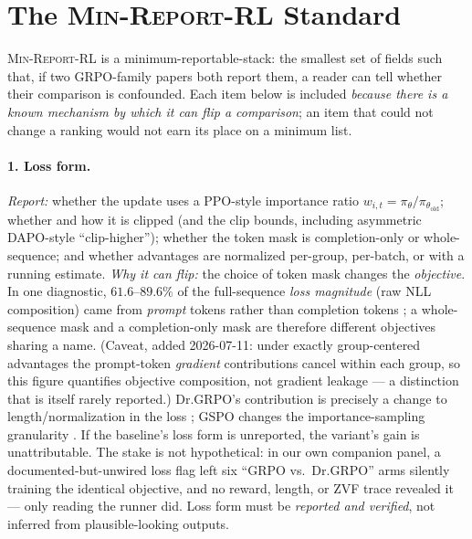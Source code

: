 \documentclass[11pt]{article}
\newcommand{\minreport}{\textsc{Min-Report-RL}}
\begin{document}
\section{The \minreport{} Standard}
\label{sec:standard}


\minreport{} is a minimum-reportable-stack: the smallest set of fields such
that, if two GRPO-family papers both report them, a reader can tell whether
their comparison is confounded. Each item below is included \emph{because there
is a known mechanism by which it can flip a comparison}; an item that could not
change a ranking would not earn its place on a minimum list.

\paragraph{1. Loss form.}
\emph{Report:} whether the update uses a PPO-style importance ratio
$w_{i,t}=\pi_\theta/\pi_{\theta_{\text{old}}}$; whether and how it is clipped
(and the clip bounds, including asymmetric DAPO-style ``clip-higher'');
whether the token mask is completion-only or whole-sequence; and whether
advantages are normalized per-group, per-batch, or with a running estimate.
\emph{Why it can flip:} the choice of token mask changes the
\emph{objective}. In one diagnostic, $61.6$--$89.6\%$ of the full-sequence
\emph{loss magnitude} (raw NLL composition) came from \emph{prompt} tokens
rather than completion tokens \cite{zvfaudit2026}; a whole-sequence mask and
a completion-only mask are therefore different objectives sharing a name.
(Caveat, added 2026-07-11: under exactly group-centered advantages the
prompt-token \emph{gradient} contributions cancel within each group, so this
figure quantifies objective composition, not gradient leakage --- a
distinction that is itself rarely reported.) Dr.GRPO's contribution is
precisely a change to length/normalization in the loss \cite{tong2025drgrpo}; GSPO
changes the importance-sampling granularity \cite{qwen2025gspo}. If the baseline's
loss form is unreported, the variant's gain is unattributable. The stake is not
hypothetical: in our own companion panel, a documented-but-unwired loss flag
left six ``GRPO vs.\ Dr.GRPO'' arms silently training the identical objective,
and no reward, length, or ZVF trace revealed it --- only reading the runner
did. Loss form must be \emph{reported and verified}, not inferred from
plausible-looking outputs.
\end{document}
